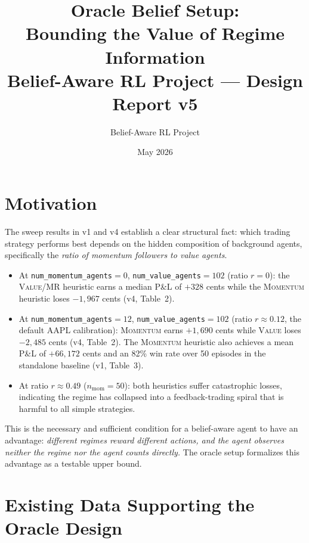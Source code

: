 \documentclass[11pt]{article}
\title{Oracle Belief Setup:\\
       Bounding the Value of Regime Information\\[0.4em]
       \large Belief-Aware RL Project --- Design Report v5}
\author{Belief-Aware RL Project}
\date{May 2026}
\begin{document}
\maketitle
\tableofcontents
\bigskip

\section{Motivation}

The sweep results in v1 and v4 establish a clear structural fact: which
trading strategy performs best depends on the hidden composition of
background agents, specifically the \emph{ratio of momentum followers to
value agents}.

\begin{itemize}
  \item At \texttt{num\_momentum\_agents}${}=0$, \texttt{num\_value\_agents}${}=102$
        (ratio $r=0$): the \textsc{Value}/MR heuristic earns a median P\&L of
        $+328$ cents while the \textsc{Momentum} heuristic loses $-1{,}967$
        cents (v4, Table~2).
  \item At \texttt{num\_momentum\_agents}${}=12$, \texttt{num\_value\_agents}${}=102$
        (ratio $r\approx 0.12$, the default AAPL calibration): \textsc{Momentum}
        earns $+1{,}690$ cents while \textsc{Value} loses $-2{,}485$ cents
        (v4, Table~2). The \textsc{Momentum} heuristic also achieves a mean
        P\&L of $+66{,}172$ cents and an 82\% win rate over 50 episodes in
        the standalone baseline (v1, Table~3).
  \item At ratio $r\approx 0.49$ ($n_\mathrm{mom}=50$): both heuristics suffer
        catastrophic losses, indicating the regime has collapsed into a
        feedback-trading spiral that is harmful to all simple strategies.
\end{itemize}

\noindent
This is the necessary and sufficient condition for a belief-aware agent to
have an advantage: \emph{different regimes reward different actions, and the
agent observes neither the regime nor the agent counts directly.}
The oracle setup formalizes this advantage as a testable upper bound.

\section{Existing Data Supporting the Oracle Design}
\label{sec:existing}
\end{document}
